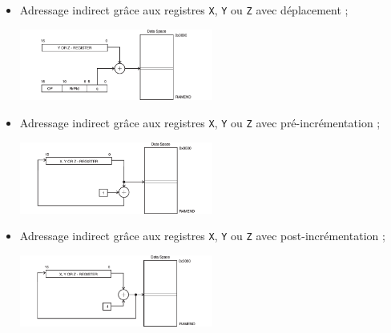 \documentclass[11pt]{article}
\begin{document}
\begin{itemize}
  \item Adressage indirect grâce aux registres \texttt{X}, \texttt{Y}
    ou \texttt{Z} avec déplacement ;
   \begin{center}
     \includegraphics[width=0.5\textwidth]{images/data_indirect_displacement.png}
   \end{center}
  \item Adressage indirect grâce aux registres \texttt{X}, \texttt{Y}
    ou \texttt{Z} avec pré-incrémentation ;
   \begin{center}
     \includegraphics[width=0.5\textwidth]{images/data_indirect_postincrement.png}
   \end{center}
  \item Adressage indirect grâce aux registres \texttt{X}, \texttt{Y}
    ou \texttt{Z} avec post-incrémentation ;
   \begin{center}
     \includegraphics[width=0.5\textwidth]{images/data_indirect_predecrement.png}
   \end{center}
\end{itemize}
\end{document}
